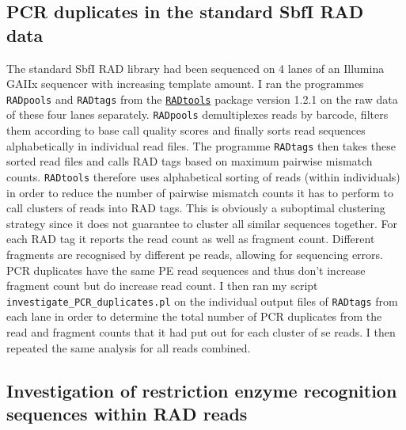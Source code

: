 \documentclass[a4paper,12pt,times,authoryear,twoside,print,index]{Classes/PhDThesisPSnPDF}\usepackage[]{graphicx}\usepackage[]{color}
\begin{document}
\begin{landscape}
\end{landscape}



\FloatBarrier
\subsection{PCR duplicates in the standard SbfI RAD data}

The standard SbfI RAD library had been sequenced on 4 lanes of an Illumina GAIIx sequencer with increasing template amount. I ran the programmes \texttt{RADpools} and \texttt{RADtags} from the \href{https://github.com/johnomics/RADtools.git}{\texttt{RADtools}} package version 1.2.1 on the raw data of these four lanes separately. \texttt{RADpools} demultiplexes reads by barcode, filters them according to base call quality scores and finally sorts read sequences alphabetically in individual read files. The programme \texttt{RADtags} then takes these sorted read files and calls \glspl{RAD tag} based on maximum pairwise mismatch counts. \texttt{RADtools} therefore uses alphabetical sorting of reads (within individuals) in order to reduce the number of pairwise mismatch counts it has to perform to call clusters of reads into \glspl{RAD tag}. This is obviously a suboptimal clustering strategy since it does not guarantee to cluster all similar sequences together. For each \gls{RAD tag} it reports the read count as well as \gls{fragment} count. Different fragments are recognised by different \gls{pe} reads, allowing for sequencing errors. PCR duplicates have the same PE read sequences and thus don't increase fragment count but do increase read count. I then ran my script \texttt{investigate\_PCR\_duplicates.pl} on the individual output files of \texttt{RADtags} from each lane in order to determine the total number of PCR duplicates from the read and fragment counts that it had put out for each cluster of \gls{se} reads. I then repeated the same analysis for all reads combined.

\FloatBarrier
\subsection{Investigation of restriction enzyme recognition sequences within RAD reads}
\end{document}
